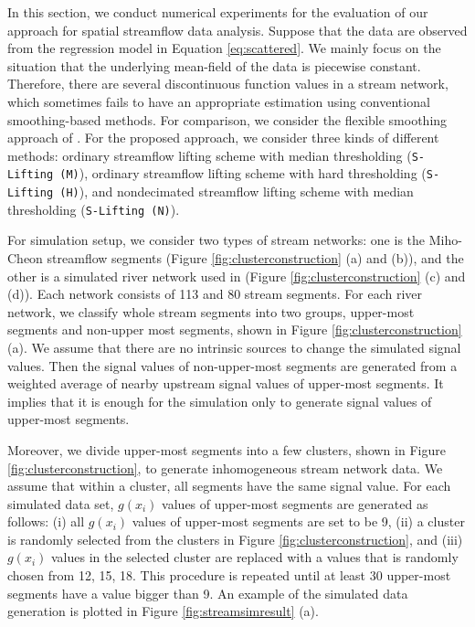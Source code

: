 \documentclass[11pt,titlepage]{article}
\begin{document}
In this section, we conduct numerical experiments for the evaluation of our approach for spatial streamflow data analysis. Suppose that the data are observed from the regression model in Equation \ref{eq:scattered}. We mainly focus on the situation that the underlying mean-field of the data is piecewise constant. Therefore, there are several discontinuous function values in a stream network, which sometimes fails to have an appropriate estimation using conventional smoothing-based methods. For comparison, we consider the flexible smoothing approach of \cite{ODonnell2014}. For the proposed approach, we consider three kinds of different methods: ordinary streamflow lifting scheme with median thresholding (\texttt{S-Lifting (M)}), ordinary streamflow lifting scheme with hard thresholding (\texttt{S-Lifting (H)}), and nondecimated streamflow lifting scheme with median thresholding (\texttt{S-Lifting (N)}).

For simulation setup, we consider two types of stream networks: one is the Miho-Cheon streamflow segments (Figure \ref{fig:clusterconstruction} (a) and (b)), and the other is a simulated river network used in \cite{Gallacher2017} (Figure \ref{fig:clusterconstruction} (c) and (d)). Each network consists of 113 and 80 stream segments.  For each river network, we classify whole stream segments into two groups, upper-most segments and non-upper most segments, shown in Figure \ref{fig:clusterconstruction} (a). %
We assume that there are no intrinsic sources to change the simulated signal values. Then the signal values of non-upper-most segments are generated from a weighted average of nearby upstream signal values of upper-most segments. It implies that it is enough for the simulation only to generate signal values of upper-most segments. 

Moreover, we divide upper-most segments into a few clusters, shown in Figure \ref{fig:clusterconstruction}, to generate inhomogeneous stream network data. We assume that within a cluster, all segments have the same signal value. For each simulated data set, $g(x_i)$ values of upper-most segments are  generated as follows: (i) all $g(x_i)$ values of upper-most segments are set to be 9, (ii) a cluster is randomly selected from the clusters in Figure  \ref{fig:clusterconstruction}, and (iii) $g(x_i)$ values in the selected cluster are replaced with a values that is randomly chosen from 12, 15, 18. This procedure is repeated until at least 30 upper-most segments have a value bigger than 9. An example of the simulated data generation is plotted in Figure \ref{fig:streamsimresult} (a).
\end{document}
